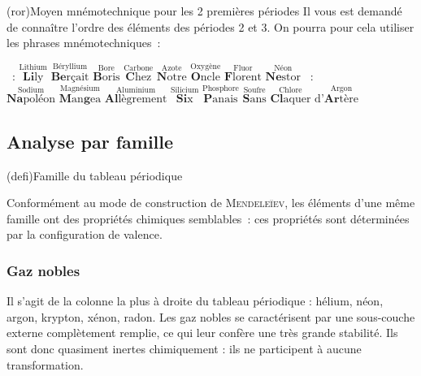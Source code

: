 \documentclass[../../main/main.tex]{subfiles}
\begin{document}
\begin{tcb*}(ror){Moyen mnémotechnique pour les 2 premières périodes}
	Il vous est demandé de connaître l'ordre des éléments des périodes 2 et 3. On
	pourra pour cela utiliser les phrases mnémotechniques~:
	\begin{itemize}
		~:
		$\overset{\text{Lithium}}{\textbf{Li}\text{ly}}
			\,\,
			\overset{\text{Béryllium}}{\textbf{Be}\text{rçait}}
			\,\,
			\overset{\text{Bore}}{\textbf{B}\text{oris}}
			\,\,
			\overset{\text{Carbone}}{\textbf{C}\text{hez}}
			\,\,
			\overset{\text{Azote}}{\textbf{N}\text{otre}}
			\,\,
			\overset{\text{Oxygène}}{\textbf{O}\text{ncle}}
			\,\,
			\overset{\text{Fluor}}{\textbf{F}\text{lorent}}
			\,\,
			\overset{\text{Néon}}{\textbf{Ne}\text{stor}}$
		~:
		$\overset{\text{Sodium}}{\textbf{Na}\text{poléon}}
			\,\,
			\overset{\text{Magnésium}}{\textbf{M}\text{an}\textbf{g}\text{ea}}
			\,\,
			\overset{\text{Aluminium}}{\textbf{Al}\text{lègrement}}
			\,\,
			\overset{\text{Silicium}}{\textbf{Si}\text{x}}
			\,\,
			\overset{\text{Phosphore}}{\textbf{P}\text{anais}}
			\,\,
			\overset{\text{Soufre}}{\textbf{S}\text{ans}}
			\,\,
			\overset{\text{Chlore}}{\textbf{Cl}\text{aquer}}
			\,\,
			\text{d'}
			\overset{\text{Argon}}{\textbf{Ar}\text{tère}}$
	\end{itemize}
\end{tcb*}

\subsection{Analyse par famille}
\begin{tcb*}(defi){Famille du tableau périodique}
\end{tcb*}
Conformément au mode de construction de \textsc{Mendeleïev}, les éléments d'une
même famille ont des propriétés chimiques semblables~: ces propriétés sont
déterminées par la configuration de valence.

\subsubsection{Gaz nobles}
Il s'agit de la colonne la plus à droite du tableau périodique : hélium, néon,
argon, krypton, xénon, radon. Les gaz nobles se caractérisent par une
sous-couche externe complètement remplie, ce qui leur confère une très grande
stabilité. Ils sont donc quasiment inertes chimiquement : ils ne participent à
aucune transformation. \bigbreak
\end{document}
